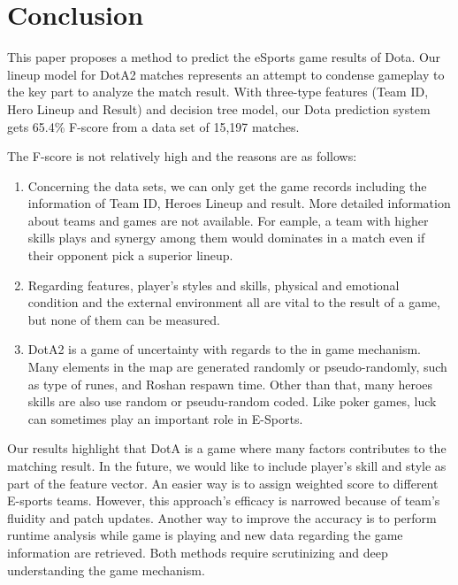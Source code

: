 \section{Conclusion}
This paper proposes a method to predict the eSports game results of Dota. Our lineup model for DotA2 matches represents an attempt to condense gameplay to the key part to analyze the match result. 
With three-type features (Team ID, Hero Lineup and Result) and decision tree model, our Dota prediction system gets 65.4\% F-score from a data set of 15,197 matches.
 
The F-score is not relatively high and the reasons are as follows:
\begin{enumerate}
\item Concerning the data sets, we can only get the game records including the information of Team ID, Heroes Lineup and result.
More detailed information about teams and games are not available. For eample, a team with higher skills plays and synergy among them would dominates in a match even if their opponent pick a superior lineup.

\item Regarding features, player’s styles and skills, physical and emotional condition and the external environment all are vital to the result of a game, but none of them can be measured.

\item DotA2 is a game of uncertainty with regards to the in game mechanism. Many elements in the map are generated randomly or pseudo-randomly, such as type of runes, and Roshan respawn time. Other than that, many heroes skills are also use random or pseudu-random coded.  Like poker games, luck can sometimes play an important role in E-Sports.

\end{enumerate}
Our results highlight that DotA is a game where many factors contributes to the matching result. In the future, we would like to include player's skill and style as part of the feature vector. An easier way is to assign weighted score to different E-sports teams. However, this approach's efficacy is narrowed because of team's fluidity and patch updates. Another way to improve the accuracy is to perform runtime analysis while game is playing and new data regarding the game information are retrieved. Both methods require scrutinizing and deep understanding the game mechanism.
